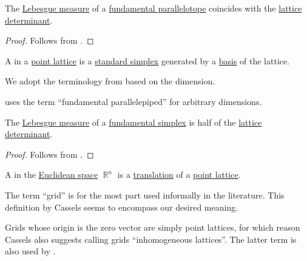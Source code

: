 \begin{proposition}\label{thm:fundamental_paralellotope_measure}
  The \hyperref[def:lebesgue_measure]{Lebesgue measure} of a \hyperref[def:fundamental_paralellotope]{fundamental parallelotope} coincides with the \hyperref[def:point_lattice_determinant]{lattice determinant}.
\end{proposition}
\begin{proof}
  Follows from .
\end{proof}

\begin{definition}\label{def:fundamental_simplex}
  A  in a \hyperref[def:point_lattice]{point lattice} is a \hyperref[def:standard_simplex]{standard simplex} generated by a \hyperref[def:point_lattice_basis]{basis} of the lattice.

  We adopt the terminology from  based on the dimension.
\end{definition}
\begin{comments}
  \item {} uses the term \enquote{fundamental parallelepiped} for arbitrary dimensions.
\end{comments}

\begin{proposition}\label{thm:fundamental_simplex_measure}
  The \hyperref[def:lebesgue_measure]{Lebesgue measure} of a \hyperref[def:fundamental_simplex]{fundamental simplex} is half of the \hyperref[def:point_lattice_determinant]{lattice determinant}.
\end{proposition}
\begin{proof}
  Follows from .
\end{proof}

\begin{definition}\label{def:euclidean_space_grid}
  A  in the \hyperref[def:euclidean_space]{Euclidean space} \( \BbbR^n \) is a \hyperref[def:rigid_motion/translation]{translation} of a \hyperref[def:point_lattice]{point lattice}.
\end{definition}
\begin{comments}
  \item The term \enquote{grid} is for the most part used informally in the literature. This definition by Cassels seems to encompass our desired meaning.

  \item Grids whose origin is the zero vector are simply point lattices, for which reason Cassels also suggests calling grids \enquote{inhomogeneous lattices}. The latter term is also used by .
\end{comments}

